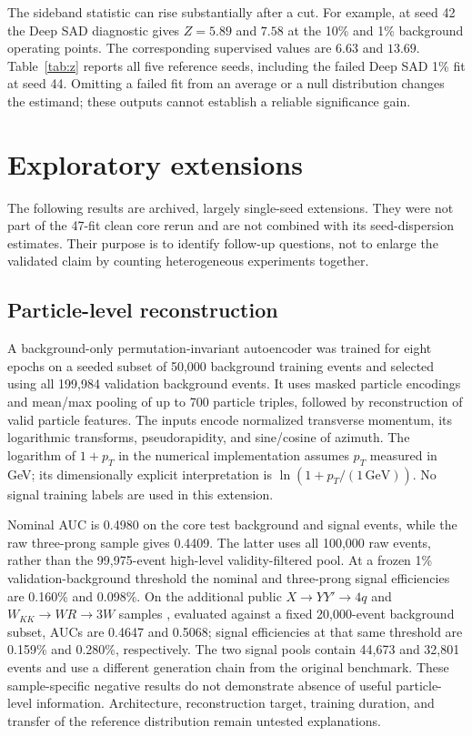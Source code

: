 \documentclass[reprint,aps,pra,amsmath,amssymb,floatfix,raggedbottom]{revtex4-2}
\begin{document}
The sideband statistic can rise substantially after a cut. For example, at seed 42 the Deep SAD diagnostic gives $Z=5.89$ and $7.58$ at the 10\% and 1\% background operating points. The corresponding supervised values are $6.63$ and $13.69$. Table~\ref{tab:z} reports all five reference seeds, including the failed Deep SAD 1\% fit at seed 44. Omitting a failed fit from an average or a null distribution changes the estimand; these outputs cannot establish a reliable significance gain.

\section{Exploratory extensions}
The following results are archived, largely single-seed extensions. They were not part of the 47-fit clean core rerun and are not combined with its seed-dispersion estimates. Their purpose is to identify follow-up questions, not to enlarge the validated claim by counting heterogeneous experiments together.

\subsection{Particle-level reconstruction}
A background-only permutation-invariant autoencoder was trained for eight epochs on a seeded subset of 50,000 background training events and selected using all 199,984 validation background events. It uses masked particle encodings and mean/max pooling of up to 700 particle triples, followed by reconstruction of valid particle features. The inputs encode normalized transverse momentum, its logarithmic transforms, pseudorapidity, and sine/cosine of azimuth. The logarithm of $1+p_T$ in the numerical implementation assumes $p_T$ measured in GeV; its dimensionally explicit interpretation is $\ln(1+p_T/(1\,\mathrm{GeV}))$. No signal training labels are used in this extension.

Nominal AUC is 0.4980 on the core test background and signal events, while the raw three-prong sample gives 0.4409. The latter uses all 100,000 raw events, rather than the 99,975-event high-level validity-filtered pool. At a frozen 1\% validation-background threshold the nominal and three-prong signal efficiencies are 0.160\% and 0.098\%. On the additional public $X\to YY'\to4q$ and $W_{KK}\to WR\to3W$ samples \cite{external}, evaluated against a fixed 20,000-event background subset, AUCs are 0.4647 and 0.5068; signal efficiencies at that same threshold are 0.159\% and 0.280\%, respectively. The two signal pools contain 44,673 and 32,801 events and use a different generation chain from the original benchmark. These sample-specific negative results do not demonstrate absence of useful particle-level information. Architecture, reconstruction target, training duration, and transfer of the reference distribution remain untested explanations.
\end{document}
